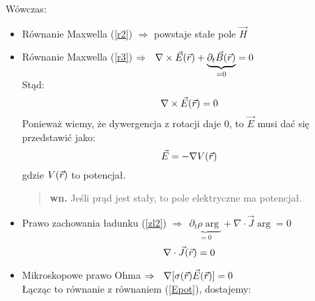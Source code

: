 	Wówczas:\begin{itemize}
	\item Równanie Maxwella (\ref{r2}) $\Rightarrow$ powstaje stałe pole $\vec{H}$
	\item Równanie Maxwella (\ref{r3}) $\Rightarrow ~~ \nabla\times\vec{E}(\vec{r})+\underbrace{\partial_t\vec{B}(\vec{r})}_{=0}=0$ \\
	Stąd:
	\begin{equation} \nabla\times\vec{E}(\vec{r})=0 \end{equation}
	Ponieważ wiemy, że dywergencja z rotacji daje 0, to $\vec{E}$ musi dać się przedstawić jako:
	\begin{equation} \vec{E}=-\nabla V(\vec{r}) \label{Epot}\end{equation}
	gdzie $V(\vec{r})$ to potencjał.
	\begin{verse} \textbf{wn.} Jeśli prąd jest stały, to pole elektryczne ma potencjał. \end{verse} 
	\item Prawo zachowania ładunku (\ref{zl2}) $\Rightarrow ~~ \underbrace{\partial_t\rho\arg}_{=0}+\nabla\cdot\vec{J}\arg=0 $
	\begin{equation} \nabla\cdot\vec{J}({\vec{r}})=0 \end{equation}
	\item Mikroskopowe prawo Ohma $\Rightarrow ~~ \nabla[\sigma(\vec{r})\vec{E}(\vec{r})]=0$ \\
	Łącząc to równanie z równaniem (\ref{Epot}), dostajemy:
	\end{itemize}

